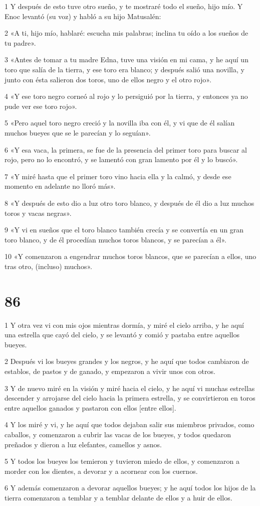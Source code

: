 \par 1 Y después de esto tuve otro sueño, y te mostraré todo el sueño, hijo mío. Y Enoc levantó (su voz) y habló a su hijo Matusalén:
\par 2 «A ti, hijo mío, hablaré: escucha mis palabras; inclina tu oído a los sueños de tu padre».
\par 3 «Antes de tomar a tu madre Edna, tuve una visión en mi cama, y ​​he aquí un toro que salía de la tierra, y ese toro era blanco; y después salió una novilla, y junto con ésta salieron dos toros, uno de ellos negro y el otro rojo».
\par 4 «Y ese toro negro corneó al rojo y lo persiguió por la tierra, y entonces ya no pude ver ese toro rojo».
\par 5 «Pero aquel toro negro creció y la novilla iba con él, y vi que de él salían muchos bueyes que se le parecían y lo seguían».
\par 6 «Y esa vaca, la primera, se fue de la presencia del primer toro para buscar al rojo, pero no lo encontró, y se lamentó con gran lamento por él y lo buscó».
\par 7 «Y miré hasta que el primer toro vino hacia ella y la calmó, y desde ese momento en adelante no lloró más».
\par 8 «Y después de esto dio a luz otro toro blanco, y después de él dio a luz muchos toros y vacas negras».
\par 9 «Y vi en sueños que el toro blanco también crecía y se convertía en un gran toro blanco, y de él procedían muchos toros blancos, y se parecían a él».
\par 10 «Y comenzaron a engendrar muchos toros blancos, que se parecían a ellos, uno tras otro, (incluso) muchos».

\chapter{86}

\par 1 Y otra vez vi con mis ojos mientras dormía, y miré el cielo arriba, y he aquí una estrella que cayó del cielo, y se levantó y comió y pastaba entre aquellos bueyes.
\par 2 Después vi los bueyes grandes y los negros, y he aquí que todos cambiaron de establos, de pastos y de ganado, y empezaron a vivir unos con otros.
\par 3 Y de nuevo miré en la visión y miré hacia el cielo, y he aquí vi muchas estrellas descender y arrojarse del cielo hacia la primera estrella, y se convirtieron en toros entre aquellos ganados y pastaron con ellos [entre ellos].
\par 4 Y los miré y vi, y he aquí que todos dejaban salir sus miembros privados, como caballos, y comenzaron a cubrir las vacas de los bueyes, y todos quedaron preñados y dieron a luz elefantes, camellos y asnos.
\par 5 Y todos los bueyes los temieron y tuvieron miedo de ellos, y comenzaron a morder con los dientes, a devorar y a acornear con los cuernos.
\par 6 Y además comenzaron a devorar aquellos bueyes; y he aquí todos los hijos de la tierra comenzaron a temblar y a temblar delante de ellos y a huir de ellos.

